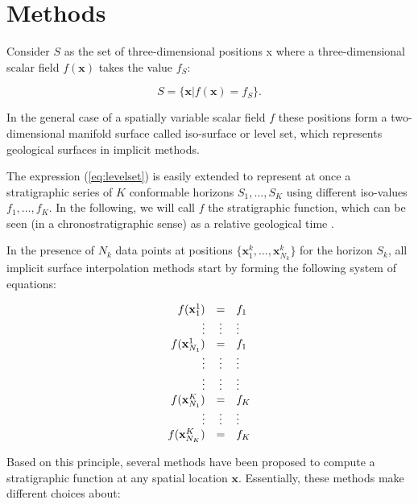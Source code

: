 \documentclass[final]{ring20}
\begin{document}
\section{Methods}
\label{sec:methods}

Consider $S$ as the set of three-dimensional positions {x} where a three-dimensional scalar field $f(\mathbf{x})$ takes the value $f_S$: 

\begin{equation}
\label{eq:levelset}
  S = \{\mathbf{x} | f(\mathbf{x}) = f_S\}.
\end{equation}

In the general case of a spatially variable scalar field $f$ these positions form a two-dimensional manifold surface called iso-surface or level set, which represents geological surfaces in implicit methods. 

The expression (\ref{eq:levelset}) is easily extended to represent 
at once a stratigraphic series of $K$ conformable horizons 
$S_1, \ldots, S_K$ using different iso-values $f_1, \ldots, f_K$. 
In the following, we will call $f$ the stratigraphic function, which can be seen 
(in a chronostratigraphic sense) as a relative geological time \citep{Mallet2004MG,Lomask2006G,Wu2012G}.

In the presence of $N_k$ data points at positions $\{\mathbf{x}_1^k, \ldots, \mathbf{x}_{N_k}^k\}$ for the horizon $S_k$, all implicit surface interpolation methods start by forming the following system of equations: 

\begin{equation}
\label{eq:datasystem}
\begin{array}{r c l}
f(\mathbf{x}_1^1) & = & f_1 \\
\vdots & \vdots & \vdots \\
f(\mathbf{x}_{N_1}^1) & = & f_1 \\
\vdots & \vdots & \vdots \\
\vdots & \vdots & \vdots \\
f(\mathbf{x}_{N_1}^K) & = & f_K \\
\vdots & \vdots & \vdots \\
f(\mathbf{x}_{N_K}^K) & = & f_K \\
\end{array}
\end{equation}

Based on this principle, several methods have been proposed to compute a stratigraphic function at any spatial location $\mathbf{x}$. Essentially, these methods make different choices about:
 
\end{document}
